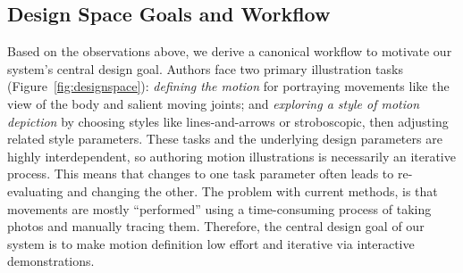 \subsection{Design Space Goals and Workflow}

Based on the observations above, we derive a canonical workflow to motivate our system's central design goal.
Authors face two primary illustration tasks (Figure~\ref{fig:designspace}):
\textit{defining the motion} for portraying movements like the view of the body and salient moving joints;
and \textit{exploring a style of motion depiction} by choosing styles like lines-and-arrows or stroboscopic, then adjusting related style parameters.
These tasks and the underlying design parameters are highly interdependent, so authoring motion illustrations is necessarily an iterative process.
This means that changes to one task parameter often leads to re-evaluating and changing the other.
The problem with current methods, is that movements are mostly ``performed'' using a time-consuming process of taking photos and manually tracing them.
%
Therefore, the central design goal of our system is to make motion definition low effort and iterative via interactive demonstrations.





